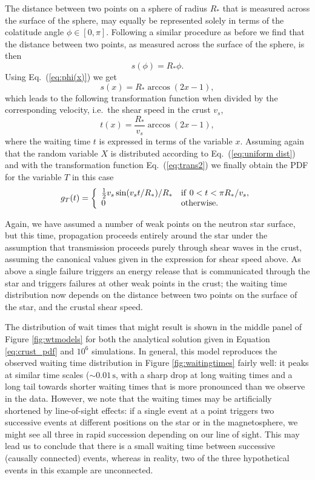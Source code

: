\documentclass[12pt]{emulateapj}
\begin{document}
The distance between two points on a sphere of radius $R_*$ that is measured across the surface of the sphere, may equally be represented solely in terms 
of the colatitude angle $\phi\in[0,\pi]$. Following a similar procedure as before we find that the distance between two points, as measured across the surface of 
the sphere, is then
\begin{equation}\label{eq}
s(\phi)=R_*\phi.
\end{equation}
Using Eq.~(\ref{eq:phi(x)}) we get
\begin{equation}\label{eq}
s(x)=R_*\arccos(2x-1),
\end{equation}
which leads to the following transformation function when divided by the corresponding velocity, i.e.\ the shear speed in the crust $v_s$, 
\begin{equation}\label{eq:trans2}
t(x)=\frac{R_*}{v_s}\arccos\left(2x-1\right),
\end{equation}
where the waiting time $t$ is expressed in terms of the variable $x$. Assuming again that the random variable $X$ is distributed according to 
Eq.~(\ref{eq:uniform dist}) and with the transformation function Eq.~(\ref{eq:trans2}) we finally obtain the PDF for the variable $T$ in this case
\begin{equation}\label{eq:crust_pdf}
g_T(t) = \left\{
\begin{array}{ll}
\frac{1}{2}v_s\sin(v_st/R_*)/R_* &  {\rm if~} 0<t<\pi R_*/v_s,\\
0 & {\rm otherwise}.
\end{array} \right.
\end{equation}

Again, we have assumed a number of weak points on the neutron star surface, but this time, propagation proceeds entirely around the star under 
the assumption that transmission proceeds purely through shear waves in the crust, assuming the canonical values given in the expression for shear 
speed above.  As above a single failure triggers an energy release that is communicated through the star and triggers failures at other weak points in 
the crust; the waiting time distribution now depends on the distance between two points on the surface of the star, and the crustal shear speed. 

The distribution of wait times that might result is shown in the middle panel of Figure \ref{fig:wtmodels} for both the analytical solution given in Equation
 \ref{eq:crust_pdf} and $10^{6}$ simulations. In general, this model reproduces the observed waiting time distribution in Figure \ref{fig:waitingtimes} fairly 
 well: it peaks at similar time scales ($\sim\!\! 0.01\,\mathrm{s}$, with a sharp drop at long waiting times and a long tail towards shorter waiting times that 
 is more pronounced than we observe in the data. However, we note that the waiting times may be artificially shortened by line-of-sight effects: if a single 
 event at a point triggers two successive events at different positions on the star or in the magnetosphere, we might see all three in rapid succession 
 depending on our line of sight. This may lead us to conclude that there is a small waiting time between successive (causally connected) events, whereas 
 in reality, two of the three hypothetical events in this example are unconnected.
\end{document}
